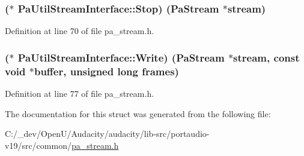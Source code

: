 \subsubsection[{\texorpdfstring{Stop}{Stop}}]{($\ast$ Pa\+Util\+Stream\+Interface\+::\+Stop) ({\bf Pa\+Stream} $\ast$stream)}\hypertarget{struct_pa_util_stream_interface_acbc38a842649fb8bca53c398e52f0322}{}\label{struct_pa_util_stream_interface_acbc38a842649fb8bca53c398e52f0322}


Definition at line 70 of file pa\+\_\+stream.\+h.

\subsubsection[{\texorpdfstring{Write}{Write}}]{($\ast$ Pa\+Util\+Stream\+Interface\+::\+Write) ({\bf Pa\+Stream} $\ast$stream, {\bf const} {\bf void} $\ast${\bf buffer}, unsigned long frames)}\hypertarget{struct_pa_util_stream_interface_a71eca20886fabf7c0d0de557ba485428}{}\label{struct_pa_util_stream_interface_a71eca20886fabf7c0d0de557ba485428}


Definition at line 77 of file pa\+\_\+stream.\+h.



The documentation for this struct was generated from the following file\+:\begin{DoxyCompactItemize}
\item 
C\+:/\+\_\+dev/\+Open\+U/\+Audacity/audacity/lib-\/src/portaudio-\/v19/src/common/\hyperlink{pa__stream_8h}{pa\+\_\+stream.\+h}\end{DoxyCompactItemize}
